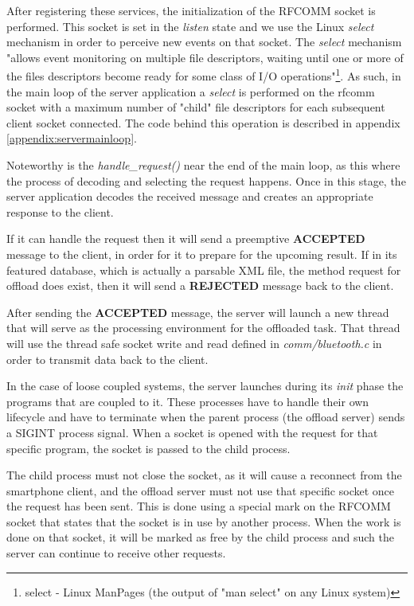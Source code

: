 After registering these services, the initialization of the RFCOMM socket is performed. This socket is set in the \textit{listen} state and we use the Linux \textit{select}\cite{ostrowski2000mechanism} mechanism in order to perceive new events on that socket. The \textit{select} mechanism "allows event monitoring on multiple file descriptors, waiting until one or more of the files descriptors become ready for some class of I/O operations"\footnote{select - Linux ManPages (the output of "man select" on any Linux system)}. As such, in the main loop of the server application a \textit{select} is performed on the rfcomm socket with a maximum number of "child" file descriptors for each subsequent client socket connected. The code behind this operation is described in appendix \ref{appendix:servermainloop}.

Noteworthy is the \textit{handle_request()} near the end of the main loop, as this where the process of decoding and selecting the request happens. Once in this stage, the server application decodes the received message and creates an appropriate response to the client.

If it can handle the request then it will send a preemptive \textbf{ACCEPTED} message to the client, in order for it to prepare for the upcoming result. If in its featured database, which is actually a parsable XML file, the method request for offload does exist, then it will send a \textbf{REJECTED} message back to the client.

After sending the \textbf{ACCEPTED} message, the server will launch a new thread that will serve as the processing environment for the offloaded task. That thread will use the thread safe socket write and read defined in \textit{comm/bluetooth.c} in order to transmit data back to the client.

In the case of loose coupled systems, the server launches during its \textit{init} phase the programs that are coupled to it. These processes have to handle their own lifecycle and have to terminate when the parent process (the offload server) sends a SIGINT process signal. When a socket is opened with the request for that specific program, the socket is passed to the child process. 

The child process must not close the socket, as it will cause a reconnect from the smartphone client, and the offload server must not use that specific socket once the request has been sent. This is done using a special mark on the RFCOMM socket that states that the socket is in use by another process. When the work is done on that socket, it will be marked as free by the child process and such the server can continue to receive other requests.

